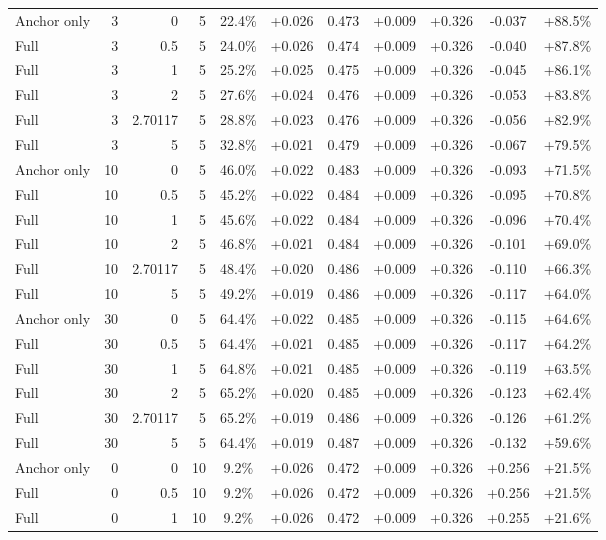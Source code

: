 \begin{table}[htbp]
\begin{tabular}{lrrrccccccc}
Anchor only & 3 & 0 & 5 & 22.4\% & +0.026 & 0.473 & +0.009 & +0.326 & -0.037 & +88.5\% \\
Full & 3 & 0.5 & 5 & 24.0\% & +0.026 & 0.474 & +0.009 & +0.326 & -0.040 & +87.8\% \\
Full & 3 & 1 & 5 & 25.2\% & +0.025 & 0.475 & +0.009 & +0.326 & -0.045 & +86.1\% \\
Full & 3 & 2 & 5 & 27.6\% & +0.024 & 0.476 & +0.009 & +0.326 & -0.053 & +83.8\% \\
Full & 3 & 2.70117 & 5 & 28.8\% & +0.023 & 0.476 & +0.009 & +0.326 & -0.056 & +82.9\% \\
Full & 3 & 5 & 5 & 32.8\% & +0.021 & 0.479 & +0.009 & +0.326 & -0.067 & +79.5\% \\
Anchor only & 10 & 0 & 5 & 46.0\% & +0.022 & 0.483 & +0.009 & +0.326 & -0.093 & +71.5\% \\
Full & 10 & 0.5 & 5 & 45.2\% & +0.022 & 0.484 & +0.009 & +0.326 & -0.095 & +70.8\% \\
Full & 10 & 1 & 5 & 45.6\% & +0.022 & 0.484 & +0.009 & +0.326 & -0.096 & +70.4\% \\
Full & 10 & 2 & 5 & 46.8\% & +0.021 & 0.484 & +0.009 & +0.326 & -0.101 & +69.0\% \\
Full & 10 & 2.70117 & 5 & 48.4\% & +0.020 & 0.486 & +0.009 & +0.326 & -0.110 & +66.3\% \\
Full & 10 & 5 & 5 & 49.2\% & +0.019 & 0.486 & +0.009 & +0.326 & -0.117 & +64.0\% \\
Anchor only & 30 & 0 & 5 & 64.4\% & +0.022 & 0.485 & +0.009 & +0.326 & -0.115 & +64.6\% \\
Full & 30 & 0.5 & 5 & 64.4\% & +0.021 & 0.485 & +0.009 & +0.326 & -0.117 & +64.2\% \\
Full & 30 & 1 & 5 & 64.8\% & +0.021 & 0.485 & +0.009 & +0.326 & -0.119 & +63.5\% \\
Full & 30 & 2 & 5 & 65.2\% & +0.020 & 0.485 & +0.009 & +0.326 & -0.123 & +62.4\% \\
Full & 30 & 2.70117 & 5 & 65.2\% & +0.019 & 0.486 & +0.009 & +0.326 & -0.126 & +61.2\% \\
Full & 30 & 5 & 5 & 64.4\% & +0.019 & 0.487 & +0.009 & +0.326 & -0.132 & +59.6\% \\
Anchor only & 0 & 0 & 10 & 9.2\% & +0.026 & 0.472 & +0.009 & +0.326 & +0.256 & +21.5\% \\
Full & 0 & 0.5 & 10 & 9.2\% & +0.026 & 0.472 & +0.009 & +0.326 & +0.256 & +21.5\% \\
Full & 0 & 1 & 10 & 9.2\% & +0.026 & 0.472 & +0.009 & +0.326 & +0.255 & +21.6\% \\

\end{tabular}
\end{table}
